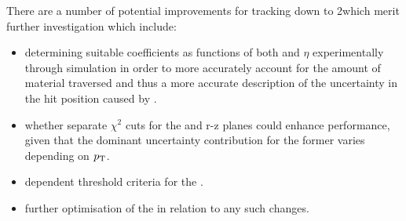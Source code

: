 {%
%   


There are a number of potential improvements for tracking down to 2\GeV which merit further investigation which include:
\begin{itemize}
\item determining suitable coefficients as functions of both \pT and $\eta$ experimentally through simulation in order to more accurately account for the amount of material traversed and thus a more accurate description of the uncertainty in the hit position caused by \MS.
\item whether separate \KF $\chi^{2}$ cuts for the \rphi and r-z planes could enhance performance, given that the dominant uncertainty contribution for the former varies depending on $p_{\mathrm{T}}$.
\item \pt dependent threshold criteria for the \HT.
\item further optimisation of the \KF in relation to any such changes.
\end{itemize}


}
